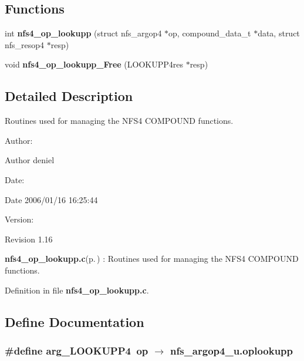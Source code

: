 \subsection*{Functions}
\begin{CompactItemize}
\item 
int {\bf nfs4\_\-op\_\-lookupp} (struct nfs\_\-argop4 $\ast$op, compound\_\-data\_\-t $\ast$data, struct nfs\_\-resop4 $\ast$resp)
\item 
void {\bf nfs4\_\-op\_\-lookupp\_\-Free} (LOOKUPP4res $\ast$resp)
\end{CompactItemize}


\subsection{Detailed Description}
Routines used for managing the NFS4 COMPOUND functions. 

\begin{Desc}
\item[Author:]\begin{Desc}
\item[Author]deniel \end{Desc}
\end{Desc}
\begin{Desc}
\item[Date:]\begin{Desc}
\item[Date]2006/01/16 16:25:44 \end{Desc}
\end{Desc}
\begin{Desc}
\item[Version:]\begin{Desc}
\item[Revision]1.16 \end{Desc}
\end{Desc}
{\bf nfs4\_\-op\_\-lookupp.c}{\rm (p.\,\pageref{nfs4__op__lookupp_8c})} : Routines used for managing the NFS4 COMPOUND functions.

Definition in file {\bf nfs4\_\-op\_\-lookupp.c}.

\subsection{Define Documentation}
\subsubsection{\setlength{\rightskip}{0pt plus 5cm}\#define arg\_\-LOOKUPP4\ op $\rightarrow$ nfs\_\-argop4\_\-u.oplookupp}\label{nfs4__op__lookupp_8c_a0}


